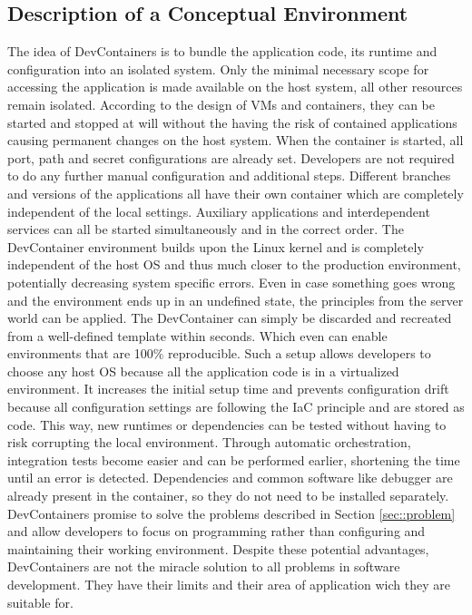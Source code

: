     \subsection{Description of a Conceptual Environment}
    The idea of DevContainers is to bundle the application code, its runtime and configuration into an isolated system. Only the minimal necessary scope for accessing the application is made available on the host system, all other resources remain isolated. According to the design of \ac{VM}s and containers, they can be started and stopped at will without the having the risk of contained applications causing permanent changes on the host system. When the container is started, all port, path and secret configurations are already set. Developers are not required to do any further manual configuration and additional steps. Different branches and versions of the applications all have their own container which are completely independent of the local settings. Auxiliary applications and interdependent services can all be started simultaneously and in the correct order. The DevContainer environment builds upon the Linux kernel and is completely independent of the host \ac{OS} and thus much closer to the production environment, potentially decreasing system specific errors. Even in case something goes wrong and the environment ends up in an undefined state, the principles from the server world can be applied. The DevContainer can simply be discarded and recreated from a well-defined template within seconds. Which even can enable environments that are 100\% reproducible.\newline
    Such a setup allows developers to choose any host \acl{OS} because all the application code is in a virtualized environment. It increases the initial setup time and prevents configuration drift because all configuration settings are following the \ac{IaC} principle and are stored as code. This way, new runtimes or dependencies can be tested without having to risk corrupting the local environment. Through automatic orchestration, integration tests become easier and can be performed earlier, shortening the time until an error is detected. Dependencies and common software like debugger are already present in the container, so they do not need to be installed separately. DevContainers promise to solve the problems described in Section \ref{sec::problem} and allow developers to focus on programming rather than configuring and maintaining their working environment.\newline
    Despite these potential advantages, DevContainers are not the miracle solution to all problems in software development. They have their limits and their area of application wich they are suitable for.

